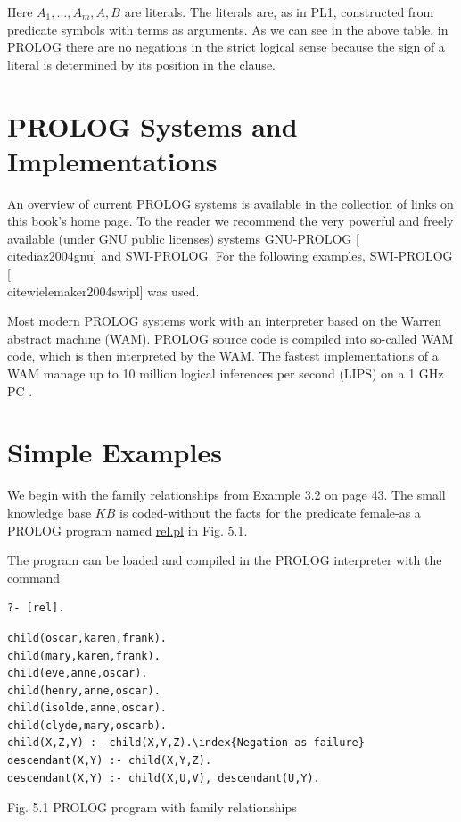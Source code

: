 \documentclass[10pt]{book}
\begin{document}
Here $A_{1}, \ldots, A_{m}, A, B$ are literals. The literals are, as in PL1, constructed from predicate symbols with terms as arguments. As we can see in the above table, in PROLOG there are no negations in the strict logical sense because the sign of a literal is determined by its position in the clause.

\section{PROLOG Systems and Implementations}
An overview of current PROLOG systems is available in the collection of links on this book's home page. To the reader we recommend the very powerful and freely available (under GNU public licenses) systems GNU-PROLOG [\\cite{diaz2004gnu}] and SWI-PROLOG. For the following examples, SWI-PROLOG [\\cite{wielemaker2004swipl}] was used.

Most modern PROLOG systems work with an interpreter based on the Warren abstract machine (WAM). PROLOG source code is compiled into so-called WAM code, which is then interpreted by the WAM. The fastest implementations of a WAM manage up to 10 million logical inferences per second (LIPS) on a 1 GHz PC .

\section{Simple Examples}
We begin with the family relationships from Example 3.2 on page 43. The small knowledge base $K B$ is coded-without the facts for the predicate female-as a PROLOG program named \href{http://rel.pl}{rel.pl} in Fig. 5.1.

The program can be loaded and compiled in the PROLOG interpreter with the command

\begin{verbatim}
?- [rel].
\end{verbatim}

\begin{verbatim}
child(oscar,karen,frank).
child(mary,karen,frank).
child(eve,anne,oscar).
child(henry,anne,oscar).
child(isolde,anne,oscar).
child(clyde,mary,oscarb).
child(X,Z,Y) :- child(X,Y,Z).\index{Negation as failure}
descendant(X,Y) :- child(X,Y,Z).
descendant(X,Y) :- child(X,U,V), descendant(U,Y).
\end{verbatim}

Fig. 5.1 PROLOG program with family relationships
\end{document}
